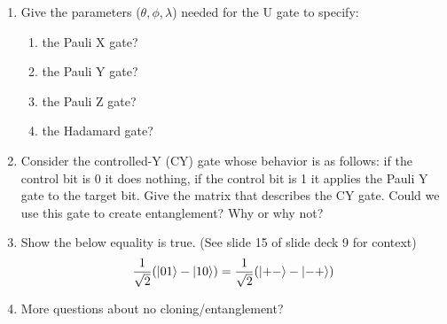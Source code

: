 \documentclass[12pt]{article}
\begin{document}
\begin{enumerate}[font=\bfseries]
    \item Give the parameters ($\theta,\phi,\lambda$) needed for the U gate to specify:
        \begin{enumerate}
            \item the Pauli X gate?
            \item the Pauli Y gate?
            \item the Pauli Z gate?
            \item the Hadamard gate?
        \end{enumerate}
    \item Consider the controlled-Y (CY) gate whose behavior is as follows: if the control bit is 0 it does nothing, if the control bit is 1 it applies the Pauli Y gate to the target bit. Give the matrix that describes the CY gate. Could we use this gate to create entanglement? Why or why not?
    \item Show the below equality is true. (See slide 15 of slide deck 9 for context)
    \[\frac{1}{\sqrt{2}}(\ket{01} - \ket{10}) = \frac{1}{\sqrt{2}}(\ket{+-} - \ket{-+})\]
    \item More questions about no cloning/entanglement?
\end{enumerate}
\end{document}
